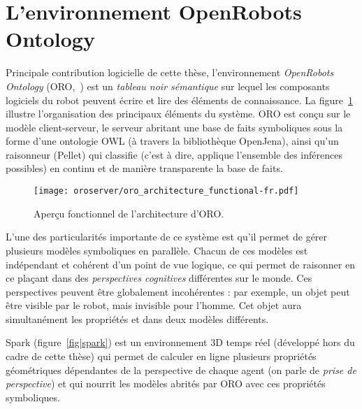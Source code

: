 
\section{L'environnement OpenRobots Ontology}

Principale contribution logicielle de cette thèse, l'environnement
\emph{OpenRobots Ontology} (ORO,~\cite{Lemaignan2010}) est un \emph{tableau
noir sémantique} sur lequel les composants logiciels du robot peuvent écrire et
lire des éléments de connaissance. La figure~\ref{fig|oro-overview} illustre
l'organisation des principaux éléments du système. ORO est conçu sur le modèle
client-serveur, le serveur abritant une base de faits symboliques sous la forme
d'une ontologie OWL (à travers la bibliothèque {\sc OpenJena}), ainsi qu'un
raisonneur ({\sc Pellet}) qui classifie (c'est à dire, applique l'ensemble des
inférences possibles) en continu et de manière transparente la base de faits.

\begin{figure}
\centering
  \texttt{[image: oroserver/oro\_architecture\_functional-fr.pdf]}
  \caption{Aperçu fonctionnel de l'architecture d'ORO.}
  \label{fig|oro-overview}
\end{figure}

L'une des particularités importante de ce système est qu'il permet de gérer
plusieurs modèles symboliques en parallèle. Chacun de ces modèles est
indépendant et cohérent d'un point de vue logique, ce qui permet de raisonner
en ce plaçant dans des \emph{perspectives cognitives} différentes sur le monde.
Ces perspectives peuvent être globalement incohérentes : par exemple, un objet
peut être visible par le robot, mais invisible pour l'homme. Cet objet aura
simultanément les propriétés  et
 dans deux modèles différents.

{\sc Spark} (figure~\ref{fig|spark}) est un environnement 3D temps réel (développé hors du cadre de
cette thèse) qui permet de calculer en ligne plusieurs propriétés géométriques
dépendantes de la perspective de chaque agent (on parle de \emph{prise de
perspective}) et qui nourrit les modèles abrités par ORO avec ces propriétés symboliques.

